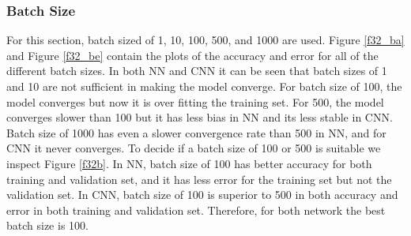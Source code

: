 \documentclass[12pt]{article}
\begin{document}
\subsubsection*{Batch Size}
For this section, batch sized of 1, 10, 100, 500, and 1000 are used. Figure \ref{f32_ba} and Figure \ref{f32_be} contain the plots of the accuracy and error for all of the different batch sizes. In both NN and CNN it can be seen that batch sizes of 1 and 10 are not sufficient in making the model converge. For batch size of 100, the model converges but now it is over fitting the training set. For 500, the model converges slower than 100 but it has less bias in NN and its less stable in CNN. Batch size of 1000 has even a slower convergence rate than 500 in NN, and for CNN it never converges. To decide if a batch size of 100 or 500 is suitable we inspect Figure \ref{f32b}. In NN, batch size of 100 has better accuracy for both training and validation set, and it has less error for the training set but not the validation set. In CNN, batch size of 100 is superior to 500 in both accuracy and error in both training and validation set. Therefore, for both network the best batch size is 100.  
  
\end{document}

